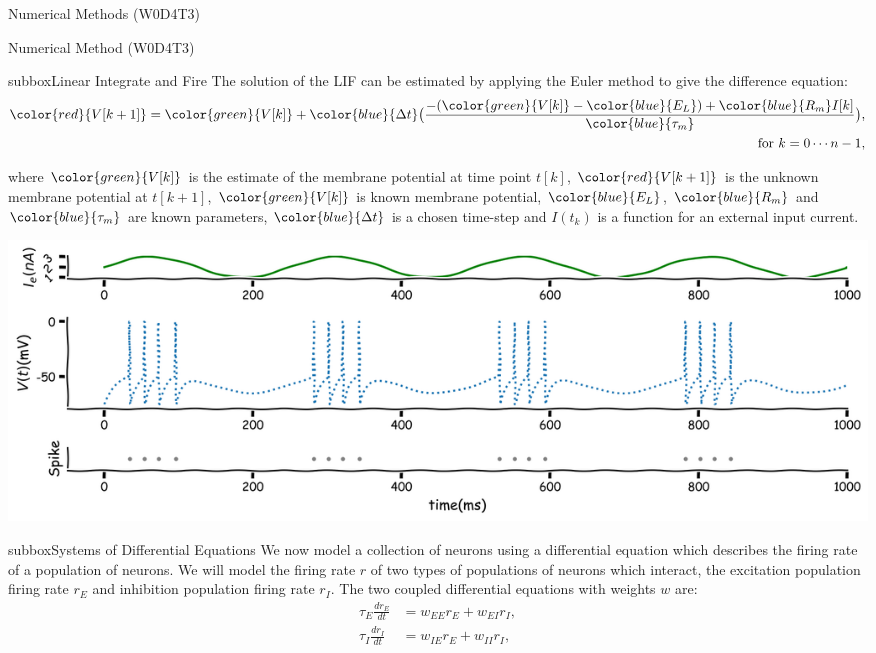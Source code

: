 \begin{multicols}{3}
\begin{textbox}{Numerical Methods (W0D4T3) }
\end{textbox}
\begin{textbox}{Numerical Method (W0D4T3)}
\begin{subbox}{subbox}{Linear Integrate and Fire }
\scriptsize
The solution of the LIF can be estimated by applying the Euler method to give the difference equation:
\begin{align*}
\color{red}{V[k+1]}=\color{green}{V[k]}+\color{blue}{\Delta t}\big(\frac{-(\color{green}{V[k]}-\color{blue}{E_L}) + \color{blue}{R_m}I[k]}{\color{blue}{\tau_m}}\big),\\
\text{for } k=0\cdots n-1,
\end{align*}

where $\color{green}{V[k]}$ is the estimate of the membrane potential at time point $t[k]$,
 $\color{red}{V[k+1]}$ is the unknown membrane potential at $t[k+1]$, $\color{green}{V[k]} $ is known membrane potential, $\color{blue}{E_L}$, $\color{blue}{R_m}$ and $\color{blue}{\tau_m}$ are known parameters, $\color{blue}{\Delta t}$ is a chosen time-step and  $I(t_k)$ is a function for an external input current.
 
\centering
\includegraphics[scale=0.1]{Figures/PreCourse/CFigure8.png}
\end{subbox}

\begin{subbox}{subbox}{Systems of Differential Equations}
\scriptsize
We now model a collection of neurons using a differential equation which describes the firing rate of a population of neurons. 
We will model the firing rate $r$ of two types of populations of neurons which interact, the excitation population firing rate $r_E$ and inhibition population firing rate $r_I$.
 The two coupled differential equations with weights $w$ are:
\begin{align}
\tau_E \frac{dr_E}{dt} &=w_{EE}r_E +w_{EI}r_I, \\
\tau_I \frac{dr_I}{dt} &=w_{IE}r_E +w_{II}r_I ,
\end{align}


\end{subbox}
\end{textbox}
\end{multicols}
